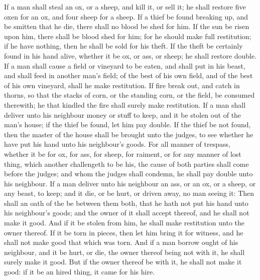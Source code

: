 \begin{biblechapter} %
\verse If a man shall steal an ox, or a sheep, and kill it, or sell it; he shall restore five oxen for an ox, and four sheep for a sheep.
\verse If a thief be found breaking up, and be smitten that he die, there shall no blood be shed for him.
\verse If the sun be risen upon him, there shall be blood shed for him; for he should make full restitution; if he have nothing, then he shall be sold for his theft.
\verse If the theft be certainly found in his hand alive, whether it be ox, or ass, or sheep; he shall restore double.
\verse If a man shall cause a field or vineyard to be eaten, and shall put in his beast, and shall feed in another man's field; of the best of his own field, and of the best of his own vineyard, shall he make restitution.
\verse If fire break out, and catch in thorns, so that the stacks of corn, or the standing corn, or the field, be consumed therewith; he that kindled the fire shall surely make restitution.
\verse If a man shall deliver unto his neighbour money or stuff to keep, and it be stolen out of the man's house; if the thief be found, let him pay double.
\verse If the thief be not found, then the master of the house shall be brought unto the judges, to see whether he have put his hand unto his neighbour's goods.
\verse For all manner of trespass, whether it be for ox, for ass, for sheep, for raiment, or for any manner of lost thing, which another challengeth to be his, the cause of both parties shall come before the judges; and whom the judges shall condemn, he shall pay double unto his neighbour.
\verse If a man deliver unto his neighbour an ass, or an ox, or a sheep, or any beast, to keep; and it die, or be hurt, or driven away, no man seeing it:
\verse Then shall an oath of the \LORD be between them both, that he hath not put his hand unto his neighbour's goods; and the owner of it shall accept thereof, and he shall not make it good.
\verse And if it be stolen from him, he shall make restitution unto the owner thereof.
\verse If it be torn in pieces, then let him bring it for witness, and he shall not make good that which was torn.
\verse And if a man borrow ought of his neighbour, and it be hurt, or die, the owner thereof being not with it, he shall surely make it good.
\verse But if the owner thereof be with it, he shall not make it good: if it be an hired thing, it came for his hire.

\end{biblechapter}
